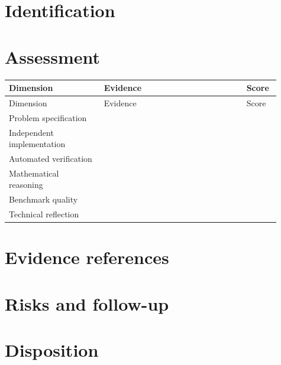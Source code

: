 \documentclass[11pt,letterpaper]{article}
\begin{document}
\tableofcontents
\clearpage
{}
\section{Identification}
\section{Assessment}
\small
\begin{longtable}{@{}p{0.32\linewidth}p{0.48\linewidth}p{0.11\linewidth}@{}}\toprule Dimension & Evidence & Score\\\midrule\endfirsthead\toprule Dimension & Evidence & Score\\\midrule\endhead
Problem specification & & \\[1.35em]
Independent implementation & & \\[1.35em]
Automated verification & & \\[1.35em]
Mathematical reasoning & & \\[1.35em]
Benchmark quality & & \\[1.35em]
Technical reflection & & \\[1.35em]
\bottomrule\end{longtable}\normalsize
\section{Evidence references}
\section{Risks and follow-up}
\section{Disposition}
\end{document}
